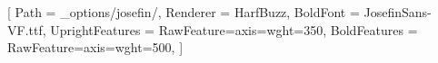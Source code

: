 
[
    Path            = _options/josefin/,
    Renderer        = HarfBuzz,
    BoldFont        = JosefinSans-VF.ttf,
    UprightFeatures = {RawFeature={axis={wght=350}}},
    BoldFeatures    = {RawFeature={axis={wght=500}}},
]
\newcommand{\covertrack}[1]{\addfontfeatures{LetterSpace=#1}} %

\newcommand{\backcovertext}[2]{%
    \setlength{\parindent}{0pt}%
    \fontsize{10.5}{13.5}\selectfont
    #1\par\bigskip
    {\coverfont\fontsize{8}{10}\selectfont\covertrack{20}ABOUT THE AUTHOR}\par\smallskip
    #2}

\newsavebox{\covertitlebox}
\newsavebox{\coverspinebox}
\newlength{\coverspinemax}
\newcommand{\spinetitlebox}[1]{%
    \sbox{\coverspinebox}{\coverfont\fontsize{#1}{#1}\selectfont\covertrack{-3}%
        \ifx\coverleadin\empty\else\coverspineleadin\ \fi\textbf{\coverspinetitle}}%
    \setlength{\coverspinemax}{0.65\dimexpr\coverpageheight mm\relax}%
    \ifdim\wd\coverspinebox>\coverspinemax \resizebox{\coverspinemax}{!}{\usebox{\coverspinebox}}\else\usebox{\coverspinebox}\fi}

